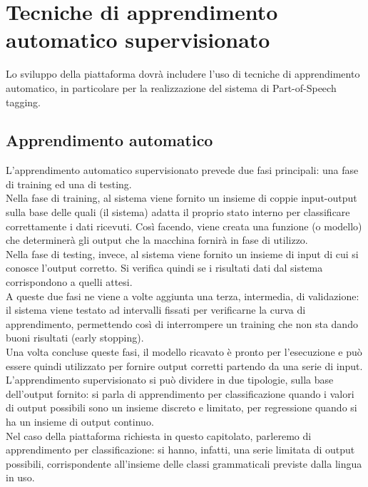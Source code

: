 \section{Tecniche di apprendimento automatico supervisionato}
Lo sviluppo della piattaforma dovrà includere l'uso di tecniche di apprendimento automatico, in particolare per la realizzazione del sistema di Part-of-Speech tagging. 
\subsection{Apprendimento automatico}
L'apprendimento automatico supervisionato prevede due fasi principali: una fase di training ed una di testing. \\
Nella fase di training, al sistema viene fornito un insieme di coppie input-output sulla base delle quali (il sistema) adatta il proprio stato interno per classificare correttamente i dati ricevuti. Così facendo, viene creata una funzione (o modello) che determinerà gli output che la macchina fornirà in fase di utilizzo. \\
Nella fase di testing, invece, al sistema viene fornito un insieme di input di cui si conosce l'output corretto. Si verifica quindi se i risultati dati dal sistema corrispondono a quelli attesi. \\
A queste due fasi ne viene a volte aggiunta una terza, intermedia, di validazione: il sistema viene testato ad intervalli fissati per verificarne la curva di apprendimento, permettendo così di interrompere un training che non sta dando buoni risultati (early stopping). \\
Una volta concluse queste fasi, il modello ricavato è pronto per l'esecuzione e può essere quindi utilizzato per fornire output corretti partendo da una serie di input. \\
L'apprendimento supervisionato si può dividere in due tipologie, sulla base dell'output fornito: si parla di apprendimento per classificazione quando i valori di output possibili sono un insieme discreto e limitato, per regressione quando si ha un insieme di output continuo. \\
Nel caso della piattaforma richiesta in questo capitolato, parleremo di apprendimento per classificazione: si hanno, infatti, una serie limitata di output possibili, corrispondente all'insieme delle classi grammaticali previste dalla lingua in uso. 

